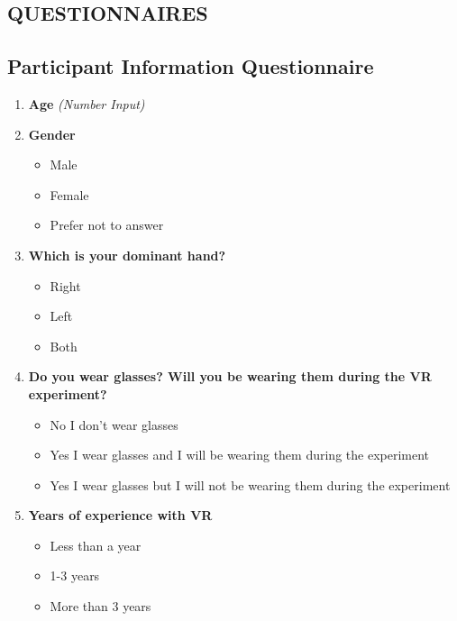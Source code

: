 \documentclass[inscr,ack,preface]{dithesis}
\begin{document}
\begin{appendix}
  \appendixstartedtrue


  \chapter{QUESTIONNAIRES}
  \label{appendix:questionnaires}

  \section{Participant Information Questionnaire}
  \begin{enumerate}
    \item \textbf{Age}
          \textit{(Number Input)}

    \item \textbf{Gender}
          \begin{itemize}
            \item Male
            \item Female
            \item Prefer not to answer
          \end{itemize}

    \item \textbf{Which is your dominant hand?}
          \begin{itemize}
            \item Right
            \item Left
            \item Both
          \end{itemize}

    \item \textbf{Do you wear glasses? Will you be wearing them during the VR experiment?}
          \begin{itemize}
            \item No I don't wear glasses
            \item Yes I wear glasses and I will be wearing them during the experiment
            \item Yes I wear glasses but I will not be wearing them during the experiment
          \end{itemize}

    \item \textbf{Years of experience with VR}
          \begin{itemize}
            \item Less than a year
            \item 1-3 years
            \item More than 3 years
          \end{itemize}


\end{enumerate}
\end{appendix}
\end{document}
